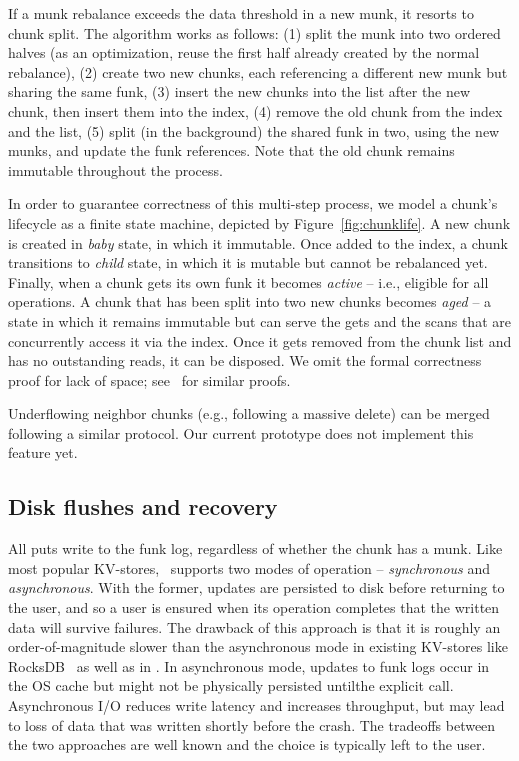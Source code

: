 {If a munk rebalance exceeds the data threshold in a new munk, it resorts to chunk split. The algorithm works as 
follows: (1) split the munk into two ordered halves (as an optimization, reuse the first half already
created by the normal rebalance), (2) create two new chunks, each referencing a different new munk
but sharing the same funk, (3) insert the new chunks into the list after the new chunk, then insert them 
into the index, (4) remove the old chunk from the index and the list, (5) split (in the background) the shared 
funk in two, using the new munks, and update the funk references. Note that the old chunk remains immutable
throughout the process. 

In order to guarantee correctness of this multi-step process, we model a chunk's lifecycle as a finite state machine, 
depicted by Figure~\ref{fig:chunklife}. A new chunk is created in \emph{baby} state, in which it immutable. Once added 
to the index, a chunk transitions to \emph{child} state, in which it is mutable but cannot be rebalanced yet. Finally, when 
a chunk gets its own funk it becomes \emph{active} -- i.e., eligible for all operations. A chunk that has been split into 
two new chunks becomes \emph{aged} -- a state in which it remains immutable but can serve the gets and the scans 
that are concurrently access it via the index. Once it gets removed from the chunk list and has no outstanding
reads, it can be disposed. We omit the formal correctness proof for lack of space; see~\cite{kiwi} for similar proofs.   

Underflowing neighbor chunks (e.g., following a massive delete) can be merged following a similar protocol. 
Our current \sys\/ prototype does not implement this feature yet. 
}

\subsection{Disk flushes and recovery}
\label{ssec:flush-recovery}

All puts write to the funk log, regardless of whether the chunk has a munk. Like most popular KV-stores, \sys\ supports 
two modes of operation -- \emph{synchronous} and \emph{asynchronous}. With the former,  updates are persisted to disk 
before returning to the user, and so a user is ensured when its operation completes that the written data will survive failures. 
The drawback of this approach is that it is roughly an order-of-magnitude slower than the asynchronous mode in existing KV-stores 
like RocksDB~\cite{RocksDB} as well as in \sys. In asynchronous mode, updates to funk logs occur in the OS cache but might 
not be physically persisted untilthe explicit  call.  Asynchronous I/O reduces write latency and increases throughput, but 
may lead to loss of data that was written shortly before the crash. The tradeoffs between the two approaches are 
well known and the choice is typically left to the user.

